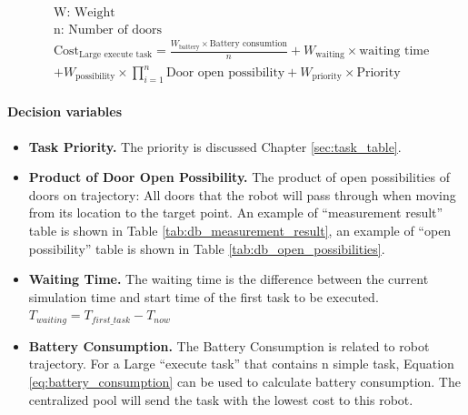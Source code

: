 \begin{equation}
	\label{eq:large_execute_task_cost} 
	\begin{aligned}
	& \mbox{W: Weight } \\
	& \mbox{n: Number of doors} \\
	& \mbox{Cost}_{\mbox{Large execute task}} = \frac{W_{\mbox{battery}} \times \mbox{Battery consumtion}}{n} + W_{\mbox{waiting}} \times \mbox{waiting time} \\
	& + W_{\mbox{possibility}} \times \prod\limits_{i=1}^n \mbox{Door open possibility}  + W_{\mbox{priority}} \times \mbox{Priority}
	\end{aligned}
\end{equation}

\paragraph{Decision variables}
\begin{itemize}
\item \textbf{Task Priority.}  The priority is discussed Chapter \ref{sec:task_table}.
\item \textbf{Product of Door Open Possibility.} The product of open possibilities of doors on trajectory: All doors that the robot will pass through when moving from its location to the target point.
	An example of ``measurement result'' table is shown in Table \ref{tab:db_measurement_result}, an example of ``open possibility'' table is shown in Table \ref{tab:db_open_possibilities}. 
\item \textbf{Waiting Time. } The waiting time is the difference between the current simulation time and start time of the first task to be executed. $T_{waiting} = T_{first\_task} - T_{now}$
\item \textbf{Battery Consumption.} The Battery Consumption is related to robot trajectory. For a Large ``execute task'' that contains n simple task, Equation \ref{eq:battery_consumption} can be used to calculate battery consumption. The centralized pool will send the task with the lowest cost to this robot.
\end{itemize}


